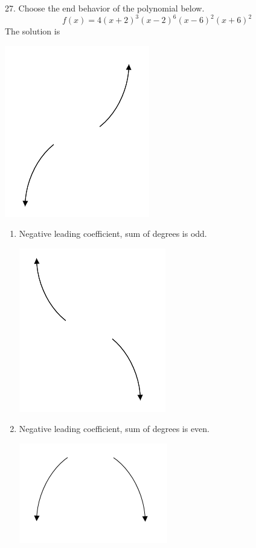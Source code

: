 \documentclass{article}[10pt]
\begin{document}
27. Choose the end behavior of the polynomial below.
$$ f(x) = 4(x + 2)^{3}(x - 2)^{6}(x - 6)^{2}(x + 6)^{2} $$ 
The solution is  
\begin{center}\includegraphics[scale=0.5]{../Figures/endBehaviorPositiveOdd.png}\end{center}\begin{enumerate}[label=\Alph*.] 
\item Negative leading coefficient, sum of degrees is odd. 
\begin{center}\includegraphics[scale=0.5]{../Figures/endBehaviorNegativeOdd.png}\end{center} 
 
\item Negative leading coefficient, sum of degrees is even. 
\begin{center}\includegraphics[scale=0.5]{../Figures/endBehaviorNegativeEven.png}\end{center} 
 

\end{enumerate}
\end{document}

